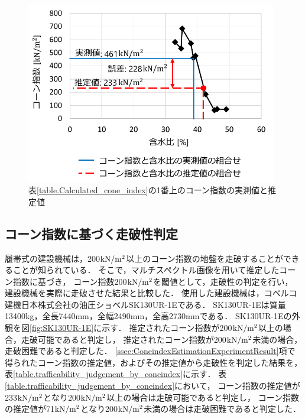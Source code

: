 \begin{figure}[p]
      \begin{center}
            \includegraphics[width=11cm]{./ch5_ConeIndexEstimation/Fig/validationsoil_coneindex_and_watercontent_relationship_compressed.pdf}
            \caption{表\ref{table.Calculated_cone_index}の1番上のコーン指数の実測値と推定値}
            \label{fig:validationsoil_coneindex_and_watercontent_relationship}
      \end{center}
\end{figure}

\clearpage

\subsection{コーン指数に基づく走破性判定}
\label{ssec:TrafficabilityJudgementByConeindex}

履帯式の建設機械は，200${\rm kN/m^2}$以上のコーン指数の地盤を走破することができることが知られている\cite{古谷2016}．
そこで，マルチスペクトル画像を用いて推定したコーン指数に基づき，
コーン指数200${\rm kN/m^2}$を閾値として，走破性の判定を行い，
建設機械を実際に走破させた結果と比較した．
使用した建設機械は，コベルコ建機日本株式会社の油圧ショベルSK130UR-1Eである．
SK130UR-1Eは質量13400kg，全長7440mm，全幅2490mm，全高2730mmである．
SK130UR-1Eの外観を図\ref{fig:SK130UR-1E}に示す．
推定されたコーン指数が200${\rm kN/m^2}$以上の場合，走破可能であると判定し，
推定されたコーン指数が200${\rm kN/m^2}$未満の場合，走破困難であると判定した．
\ref{ssec:ConeindexEstimationExperimentResult}項で得られたコーン指数の推定値，およびその推定値から走破性を判定した結果を，
表\ref{table.trafficability_judgement_by_coneindex}に示す．
表\ref{table.trafficability_judgement_by_coneindex}において，
コーン指数の推定値が233${\rm kN/m^2}$となり200${\rm kN/m^2}$以上の場合は走破可能であると判定し，
コーン指数の推定値が71${\rm kN/m^2}$となり200${\rm kN/m^2}$未満の場合は走破困難であると判定した．

